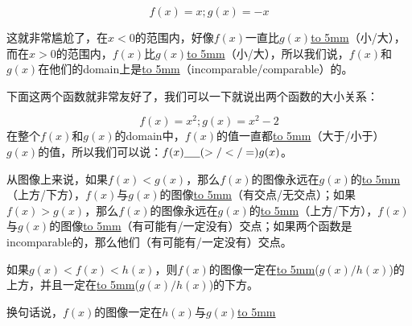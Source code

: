 \documentclass[UTF8]{ctexart}
\begin{document}
\[f(x) = x; g(x) = -x\]

这就非常尴尬了，在$x<0$的范围内，好像$f(x)$一直比$g(x)$\underline{\hbox to 5mm{}}（小/大），而在$x>0$的范围内，$f(x)$比$g(x)$\underline{\hbox to 5mm{}}（小/大），所以我们说，$f(x)$和$g(x)$在他们的domain上是\underline{\hbox to 5mm{}}（incomparable/comparable）的。

下面这两个函数就非常友好了，我们可以一下就说出两个函数的大小关系：

\begin{center}
\end{center}

\[f(x) = x^2; g(x) = x^2-2\]
在整个$f(x)$和$g(x)$的domain中，$f(x)$的值一直都\underline{\hbox to 5mm{}}（大于/小于）$g(x)$的值，所以我们可以说：$f(x)\underline{\hbox to 5mm{}}(>/</=) g(x)$。

从图像上来说，如果$f(x)<g(x)$，那么$f(x)$的图像永远在$g(x)$的\underline{\hbox to 5mm{}}（上方/下方），$f(x)$与$g(x)$的图像\underline{\hbox to 5mm{}}（有交点/无交点）；如果$f(x)>g(x)$，那么$f(x)$的图像永远在$g(x)$的\underline{\hbox to 5mm{}}（上方/下方），$f(x)$与$g(x)$的图像\underline{\hbox to 5mm{}}（有可能有/一定没有）交点；如果两个函数是incomparable的，那么他们（有可能有/一定没有）交点。

如果$g(x) < f(x) < h(x)$，则$f(x)$的图像一定在\underline{\hbox to 5mm{}}($g(x)/h(x)$)的上方，并且一定在\underline{\hbox to 5mm{}}($g(x)/h(x)$)的下方。

换句话说，$f(x)$的图像一定在$h(x)$与$g(x)$\underline{\hbox to 5mm{}}

\begin{center}
\end{center}
\end{document}
